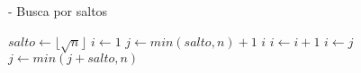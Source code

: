 \begin{algorithm}
    \caption{ - Busca por saltos \cite{shneiderman_jump_1978}}
    \begin{algorithmic}[1]
        \STATE $salto \leftarrow \lfloor \sqrt{n} \rfloor$
        \STATE $i \leftarrow 1$
        \STATE $j \leftarrow min(salto, n) + 1$
                        \RETURN $ i $
                    \ENDIF
                    \STATE $i \leftarrow i + 1$
                \ENDWHILE
                \RETURN \FALSE
            \ENDIF
            \STATE $i \leftarrow j$
            \STATE $j \leftarrow min(j + salto, n)$
        \ENDWHILE
        \RETURN \FALSE
    \end{algorithmic}
    \label{alg:busca_saltos}
\end{algorithm}